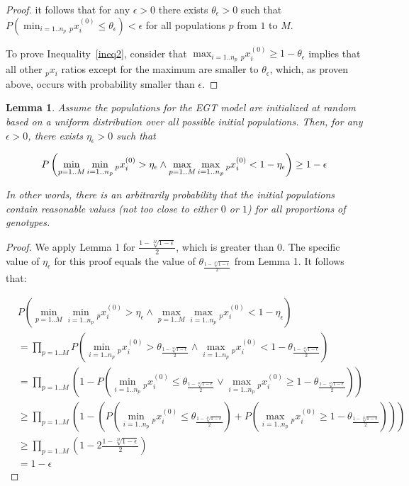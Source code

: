 \documentclass{acm_proc_article-sp}
\newtheorem{lemma}{Lemma}
\begin{document}
\begin{proof}
\noindent it follows that for any $\epsilon>0$ there exists $\theta_\epsilon>0$ such that $P\left( \min_{i=1..n_p} {_p}x^{(0)}_i \leq \theta_\epsilon \right) < \epsilon$ for all populations $p$ from $1$ to $M$.

To prove Inequality~\ref{ineq2}, consider that \mbox{$\max_{i=1..n_p} {_p}x^{(0)}_i \geq 1-\theta_\epsilon$} implies that all other ${_p}x_i$ ratios except for the maximum are smaller to $\theta_\epsilon$, which, as proven above, occurs with probability smaller than $\epsilon$.\end{proof}

\begin{lemma}
Assume the populations for the EGT model are initialized at random based on a uniform distribution over all possible initial populations.  Then, for any $\epsilon>0$, there exists $\eta_\epsilon>0$ such that

\[
P\left( \min_{p=1..M} \min_{i=1..n_p} {_p}x^{(0)}_i > \eta_\epsilon \wedge \max_{p=1..M} \max_{i=1..n_p} {_p}x^{(0)}_i < 1-\eta_\epsilon\right) \geq 1 - \epsilon\\
\]

In other words, there is an arbitrarily probability that the initial populations contain reasonable values (not too close to either $0$ or $1$) for all proportions of genotypes.
\end{lemma}

\begin{proof}
We apply Lemma 1 for $\frac{1-\sqrt[M]{1-\epsilon}}{2}$, which is greater than 0.  The specific value of $\eta_\epsilon$ for this proof equals the value of $\theta_\frac{1-\sqrt[M]{1-\epsilon}}{2}$ from Lemma 1.  It follows that:

\begin{eqnarray*}
& P\left( \min_{p=1..M} \min_{i=1..n_p} {_p}x^{(0)}_i > \eta_\epsilon \wedge \max_{p=1..M} \max_{i=1..n_p} {_p}x^{(0)}_i < 1-\eta_\epsilon \right)\\
& = \prod_{p=1..M} P \left( \min_{i=1..n_p} {_p}x^{(0)}_i > \theta_\frac{1-\sqrt[M]{1-\epsilon}}{2} \wedge \max_{i=1..n_p} {_p}x^{(0)}_i < 1-\theta_\frac{1-\sqrt[M]{1-\epsilon}}{2} \right) \\
&  =  \prod_{p=1..M} \left( 1 - P \left( \min_{i=1..n_p} {_p}x^{(0)}_i \leq \theta_\frac{1-\sqrt[M]{1-\epsilon}}{2} \vee \max_{i=1..n_p} {_p}x^{(0)}_i \geq 1-\theta_\frac{1-\sqrt[M]{1-\epsilon}}{2} \right) \right)\\
& \geq \prod_{p=1..M} \left( 1 - \left( P \left( \min_{i=1..n_p} {_p}x^{(0)}_i \leq \theta_\frac{1-\sqrt[M]{1-\epsilon}}{2} \right) + P \left( \max_{i=1..n_p} {_p}x^{(0)}_i \geq 1-\theta_\frac{1-\sqrt[M]{1-\epsilon}}{2} \right) \right) \right)\\
& \geq \prod_{p=1..M} \left( 1 - 2 \frac{1-\sqrt[M]{1-\epsilon}}{2} \right) \\
& = 1 - \epsilon
\end{eqnarray*}\end{proof}
\end{document}
